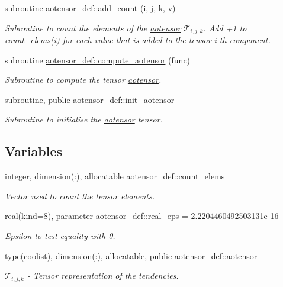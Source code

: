 \begin{DoxyCompactItemize}
subroutine \hyperlink{namespaceaotensor__def_ac8104c190904681c1fd27eec036114aa}{aotensor\+\_\+def\+::add\+\_\+count} (i, j, k, v)
\begin{DoxyCompactList}\small\item\em Subroutine to count the elements of the \hyperlink{namespaceaotensor__def_a0dc43bc9294a18f2fe57b67489f1702f}{aotensor} $\mathcal{T}_{i,j,k}$. Add +1 to count\+\_\+elems(i) for each value that is added to the tensor i-\/th component. \end{DoxyCompactList}\item 
subroutine \hyperlink{namespaceaotensor__def_a3dfccbce01ca1616c616f855c0cfa45a}{aotensor\+\_\+def\+::compute\+\_\+aotensor} (func)
\begin{DoxyCompactList}\small\item\em Subroutine to compute the tensor \hyperlink{namespaceaotensor__def_a0dc43bc9294a18f2fe57b67489f1702f}{aotensor}. \end{DoxyCompactList}\item 
subroutine, public \hyperlink{namespaceaotensor__def_ac2d5a88885d06f6dc047bee3a4ab427a}{aotensor\+\_\+def\+::init\+\_\+aotensor}
\begin{DoxyCompactList}\small\item\em Subroutine to initialise the \hyperlink{namespaceaotensor__def_a0dc43bc9294a18f2fe57b67489f1702f}{aotensor} tensor. \end{DoxyCompactList}\end{DoxyCompactItemize}
\subsection*{Variables}
\begin{DoxyCompactItemize}
\item 
integer, dimension(\+:), allocatable \hyperlink{namespaceaotensor__def_aa9e30c84efc5a81409ba9c0286c87eac}{aotensor\+\_\+def\+::count\+\_\+elems}
\begin{DoxyCompactList}\small\item\em Vector used to count the tensor elements. \end{DoxyCompactList}\item 
real(kind=8), parameter \hyperlink{namespaceaotensor__def_ab1cf9313fb1def1a17de539cfa922e35}{aotensor\+\_\+def\+::real\+\_\+eps} = 2.\+2204460492503131e-\/16
\begin{DoxyCompactList}\small\item\em Epsilon to test equality with 0. \end{DoxyCompactList}\item 
type(coolist), dimension(\+:), allocatable, public \hyperlink{namespaceaotensor__def_a0dc43bc9294a18f2fe57b67489f1702f}{aotensor\+\_\+def\+::aotensor}
\begin{DoxyCompactList}\small\item\em $\mathcal{T}_{i,j,k}$ -\/ Tensor representation of the tendencies. \end{DoxyCompactList}\end{DoxyCompactItemize}
